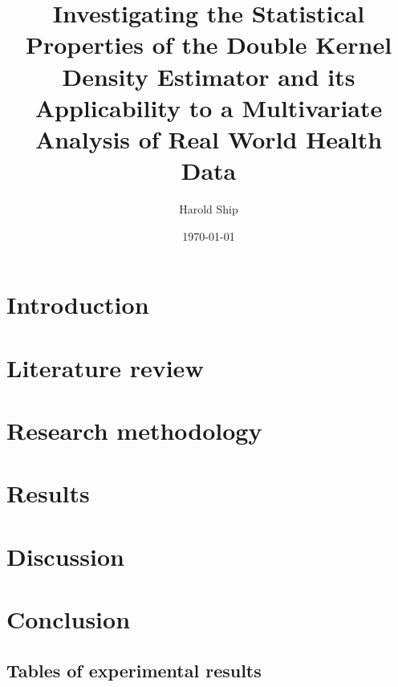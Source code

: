\documentclass[a4paper,12pt,titlepage,twoside,openany]{book}
\title{Investigating the Statistical Properties of the Double Kernel Density Estimator and its Applicability to a Multivariate Analysis of Real World Health Data}
\author{Harold Ship}
\date{\today}
\begin{document}
\frontmatter                            %
\maketitle                              %
\tableofcontents                        %

\clearpage
\listoftables
\clearpage
\listoffigures
\clearpage
\printnomenclature
\clearpage

\mainmatter                             %

\chapter{Introduction}

\chapter{Literature review}

\chapter{Research methodology}


\chapter{Results}


\chapter{Discussion}

\chapter{Conclusion}

\begin{appendices}
\chapter{Tables of experimental results}
\label{chp:results_tables}

\end{appendices}
\end{document}
